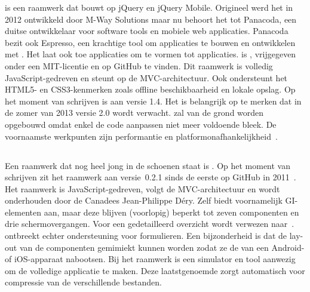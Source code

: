 
\tmp{} is een raamwerk dat bouwt op jQuery en jQuery Mobile.
Origineel werd het in 2012 ontwikkeld door M-Way Solutions maar nu behoort het tot Panacoda,  een duitse ontwikkelaar voor software tools en mobiele web applicaties.
Panacoda bezit ook Espresso,  een krachtige tool om applicaties te bouwen en ontwikkelen met \tmp{}.
Het laat ook toe applicaties om te vormen tot  applicaties. 
\tmp{} is ,  vrijgegeven onder een MIT-licentie en op GitHub te vinden.
Dit raamwerk is volledig JavaScript-gedreven en steunt op de MVC-architectuur.
Ook ondersteunt het HTML5- en CSS3-kenmerken zoals offline  beschikbaarheid en lokale opslag.
Op het moment van schrijven is \tmp{} aan versie 1.4.
Het is belangrijk op te merken dat in de zomer van 2013 versie 2.0 wordt verwacht.  
\tmp{} zal van de grond worden opgebouwd omdat enkel de code aanpassen niet meer voldoende bleek.  
De voornaamste werkpunten zijn performantie en platformonafhankelijkheid~\cite{Panacoda,Laubach2013}.

\subsection{\moobile} %
Een raamwerk dat nog heel jong in de schoenen staat is \moobile{}.
Op het moment van schrijven zit het raamwerk aan versie~0.2.1 sinds de eerste  op GitHub in 2011~\cite{Dery2013}.
Het raamwerk is JavaScript-gedreven, volgt de MVC-architectuur en wordt onderhouden door de Canadees Jean-Philippe Déry.
Zelf biedt \moobile{} voornamelijk GI-elementen aan, maar deze blijven (voorlopig) beperkt tot zeven componenten en drie schermovergangen. 
Voor een gedetailleerd overzicht wordt verwezen naar~\cite{Dery2013}.
\moobile{} ontbreekt echter ondersteuning voor formulieren.
Een bijzonderheid is dat de lay-out van de componenten gemimiekt kunnen worden zodat ze de  van een Android- of iOS-apparaat nabootsen.
Bij het raamwerk is een simulator en tool aanwezig om de volledige applicatie te maken.
Deze laatstgenoemde zorgt automatisch voor compressie van de verschillende bestanden.


